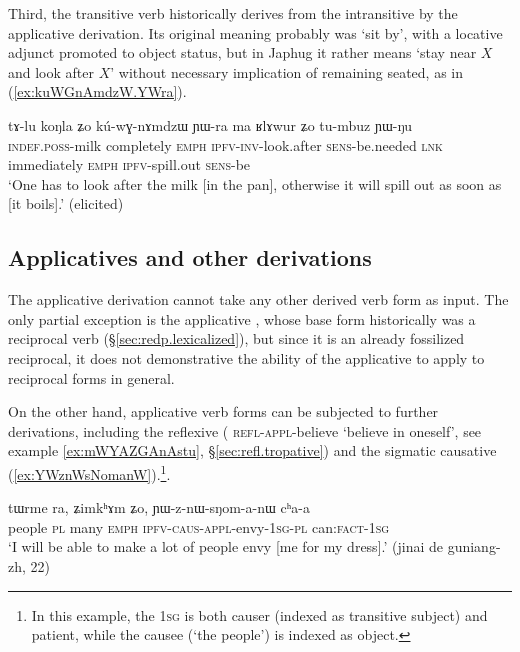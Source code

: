 Third, the transitive verb  historically derives from the intransitive  by the applicative derivation. Its original meaning probably was `sit by', with a locative adjunct promoted to object status, but in Japhug it rather means `stay near $X$ and look after $X$' without necessary implication of remaining seated, as in (\ref{ex:kuWGnAmdzW.YWra}).

\begin{exe}
\ex \label{ex:kuWGnAmdzW.YWra}
\gll tɤ-lu koŋla ʑo kú-wɣ-nɤmdzɯ ɲɯ-ra ma ʁlɤwur ʑo tu-mbuz ɲɯ-ŋu \\
\textsc{indef}.\textsc{poss}-milk completely \textsc{emph} \textsc{ipfv}-\textsc{inv}-look.after \textsc{sens}-be.needed \textsc{lnk} immediately \textsc{emph} \textsc{ipfv}-spill.out \textsc{sens}-be \\
\glt `One has to look after the milk [in the pan], otherwise it will spill out as soon as [it boils].' (elicited)
\end{exe}
 
 
\subsection{Applicatives and other derivations} \label{sec:appl.other.derivations}
The applicative derivation cannot take any other derived verb form as input. The only partial exception is the applicative , whose base form  historically was a reciprocal verb (§\ref{sec:redp.lexicalized}), but since it is an already fossilized reciprocal, it does not demonstrative the ability of the applicative to apply to reciprocal forms in general.

On the other hand, applicative verb forms can be subjected to further derivations, including the reflexive  ( \textsc{refl}-\textsc{appl}-believe `believe in oneself', see example \ref{ex:mWYAZGAnAstu}, §\ref{sec:refl.tropative}) and the sigmatic causative (\ref{ex:YWznWsNomanW}).\footnote{In this example, the \textsc{1sg} is both causer (indexed as transitive subject) and patient, while the causee (`the people') is indexed as object. }. 

\begin{exe}
\ex \label{ex:YWznWsNomanW}
\gll tɯrme ra, ʑimkʰɤm ʑo, ɲɯ-z-nɯ-sŋom-a-nɯ cʰa-a \\
people \textsc{pl} many \textsc{emph} \textsc{ipfv}-\textsc{caus}-\textsc{appl}-envy-\textsc{1sg}-\textsc{pl} can:\textsc{fact}-\textsc{1sg} \\
\glt `I will be able to make a lot of people envy [me for my dress].' (jinai de guniang-zh, 22)
\end{exe}


